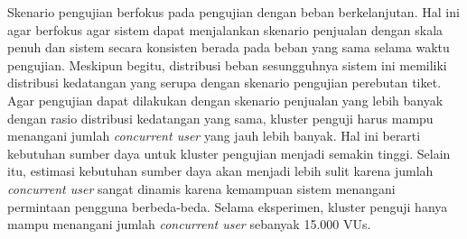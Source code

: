 Skenario pengujian berfokus pada pengujian dengan beban berkelanjutan. Hal ini agar berfokus agar sistem dapat menjalankan skenario penjualan dengan skala penuh dan sistem secara konsisten berada pada beban yang sama selama waktu pengujian. Meskipun begitu, distribusi beban sesungguhnya sistem ini memiliki distribusi kedatangan yang serupa dengan skenario pengujian perebutan tiket. Agar pengujian dapat dilakukan dengan skenario penjualan yang lebih banyak dengan rasio distribusi kedatangan yang sama, kluster penguji harus mampu menangani jumlah \textit{concurrent user} yang jauh lebih banyak. Hal ini berarti kebutuhan sumber daya untuk kluster pengujian menjadi semakin tinggi. Selain itu, estimasi kebutuhan sumber daya akan menjadi lebih sulit karena jumlah \textit{concurrent user} sangat dinamis karena kemampuan sistem menangani permintaan pengguna berbeda-beda. Selama eksperimen, kluster penguji hanya mampu menangani jumlah \textit{concurrent user} sebanyak 15.000 VUs.
